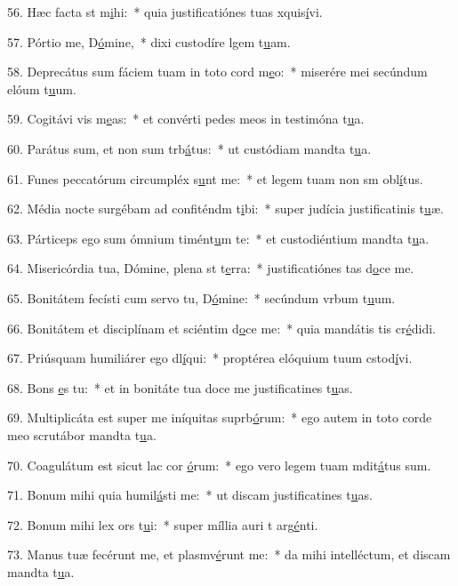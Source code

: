 56. Hæc facta st m\uline{i}hi:~* quia justificatiónes tuas xquis\uline{í}vi.\par 
57. Pórtio me, D\uline{ó}mine,~* dixi custodíre lgem t\uline{u}am.\par 
58. Deprecátus sum fáciem tuam in toto cord m\uline{e}o:~* miserére mei secúndum elóum t\uline{u}um.\par 
59. Cogitávi vis m\uline{e}as:~* et convérti pedes meos in testimóna t\uline{u}a.\par 
60. Parátus sum, et non sum trb\uline{á}tus:~* ut custódiam mandta t\uline{u}a.\par 
61. Funes peccatórum circumpléx s\uline{u}nt me:~* et legem tuam non sm obl\uline{í}tus.\par 
62. Média nocte surgébam ad confiténdm t\uline{i}bi:~* super judícia justificatinis t\uline{u}æ.\par 
63. Párticeps ego sum ómnium timént\uline{u}m te:~* et custodiéntium mandta t\uline{u}a.\par 
64. Misericórdia tua, Dómine, plena st t\uline{e}rra:~* justificatiónes tas d\uline{o}ce me.\par 
65. Bonitátem fecísti cum servo tu, D\uline{ó}mine:~* secúndum vrbum t\uline{u}um.\par 
66. Bonitátem et disciplínam et sciéntim d\uline{o}ce me:~* quia mandátis tis cr\uline{é}didi.\par 
67. Priúsquam humiliárer ego dl\uline{í}qui:~* proptérea elóquium tuum cstod\uline{í}vi.\par 
68. Bons \uline{e}s tu:~* et in bonitáte tua doce me justificatines t\uline{u}as.\par 
69. Multiplicáta est super me iníquitas suprb\uline{ó}rum:~* ego autem in toto corde meo scrutábor mandta t\uline{u}a.\par 
70. Coagulátum est sicut lac cor \uline{ó}rum:~* ego vero legem tuam mdit\uline{á}tus sum.\par 
71. Bonum mihi quia humil\uline{á}sti me:~* ut discam justificatines t\uline{u}as.\par 
72. Bonum mihi lex ors t\uline{u}i:~* super míllia auri t arg\uline{é}nti.\par 
73. Manus tuæ fecérunt me, et plasmv\uline{é}runt me:~* da mihi intelléctum, et discam mandta t\uline{u}a.\par 
